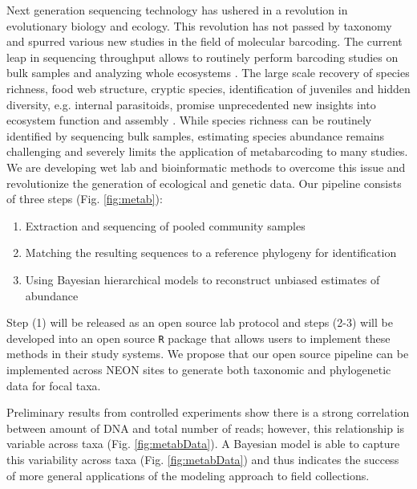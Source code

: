 \documentclass[11pt]{article}
\begin{document}
Next generation sequencing technology has ushered in a revolution in
evolutionary biology and ecology. This revolution has not passed by
taxonomy and spurred various new studies in the field of molecular
barcoding. The current leap in sequencing throughput allows to
routinely perform barcoding studies on bulk samples and analyzing
whole ecosystems \citep{shokralla2015, gibson2014, taberlet2012}. The
large scale recovery of species richness, food web structure, cryptic
species, identification of juveniles and hidden diversity,
e.g. internal parasitoids, promise unprecedented new insights into
ecosystem function and assembly \citep{krehenwinkel2016,
  shokralla2015, gibson2014, taberlet2012}. While species richness can
be routinely identified by sequencing bulk samples, estimating species
abundance remains challenging \citep{elbrecht2015} and severely limits
the application of metabarcoding to many studies. We are developing
wet lab and bioinformatic methods to overcome this issue and
revolutionize the generation of ecological and genetic data. Our
pipeline consists of three steps (Fig. \ref{fig:metab}):

\begin{enumerate}
\item Extraction and sequencing of pooled community samples
\item Matching the resulting sequences to a reference phylogeny for
  identification
\item Using Bayesian hierarchical models to reconstruct unbiased
  estimates of abundance
\end{enumerate}

Step (1) will be released as an open source lab protocol and steps
(2-3) will be developed into an open source {\tt R} package that allows
users to implement these methods in their study systems.  We propose
that our open source pipeline can be implemented across NEON sites to
generate both taxonomic and phylogenetic data for focal taxa.



Preliminary results from controlled experiments show there is a strong
correlation between amount of DNA and total number of reads; however,
this relationship is variable across taxa
(Fig. \ref{fig:metabData}). A Bayesian model is able to capture this
variability across taxa (Fig. \ref{fig:metabData}) and thus indicates
the success of more general applications of the modeling approach to
field collections.
\end{document}
